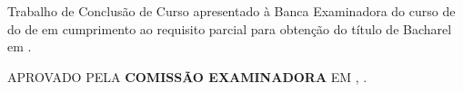 \begin{folhadeaprovacao}
	\begin{center}
		\ABNTEXchapterfont\textbf{\MakeTextUppercase{\imprimirautor}}
		\vspace*{2cm}
		\begin{center}
			\ABNTEXchapterfont\large\textbf{\MakeTextUppercase{\imprimirtitulo}}
		\end{center}
		\vspace*{2cm}
		Trabalho de Conclusão de Curso apresentado à Banca Examinadora do curso de \imprimirpreambulo do \imprimirinstituicao de \imprimirlocal em cumprimento ao requisito parcial para obtenção do título de Bacharel em \imprimirpreambulo.
		\par
		\vspace*{.5in}
		\hspace{.6\textwidth}
		\begin{minipage}{.6\textwidth}
			\begin{center}
\MakeTextUppercase{Aprovado pela \textbf{COMISSÃO EXAMINADORA} em \imprimirlocal, \imprimirdata.}
			\end{center}
		\end{minipage}
			\vspace*{\fill}
	\end{center}
\end{folhadeaprovacao}

